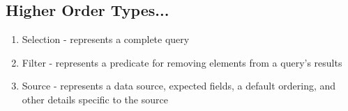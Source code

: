 \subsection{Higher Order Types...}
\begin{enumerate}
\item Selection - represents a complete query
\item Filter - represents a predicate for removing elements from a query's results
\item Source - represents a data source, expected fields, a default ordering, and other details specific to the source
\end{enumerate}
